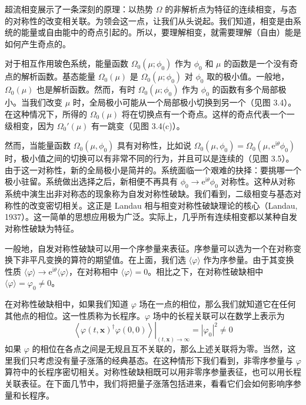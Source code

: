 超流相变展示了一条深刻的原理：以热势 $\Omega$ 的非解析点为特征的连续相变，与态的对称性的改变相关联。为领会这一点，让我们从头说起。我们知道，相变是由系统的能量或自由能中的奇点引起的。所以，要理解相变，就需要理解（自由）能是如何产生奇点的。

对于相互作用玻色系统，能量函数 $\Omega_0(\mu; \phi_0)$ 作为 $\phi_0$ 和 $\mu$ 的函数是一个没有奇点的解析函数。基态能量 $\Omega_0(\mu)$ 是 $\Omega_0(\mu; \phi_0)$ 对 $\phi_0$ 取的极小值。一般地，$\Omega_0(\mu)$ 也是解析函数。然而，有时 $\Omega_0(\mu; \phi_0)$ 作为 $\phi_0$ 的函数有多个局部极小。当我们改变 $\mu$ 时，全局极小可能从一个局部极小切换到另一个（见图 3.4）。在这种情况下，所得的 $\Omega_0(\mu)$ 将在切换点有一个奇点。这样的奇点代表一个一级相变，因为 $\Omega_0'(\mu)$ 有一跳变（见图 3.4(c)）。

然而，当能量函数 $\Omega_0(\mu,\phi_0)$ 具有对称性，比如说 $\Omega_0(\mu,\phi_0) = \Omega_0(\mu,\mathrm{e}^{\mathrm{i}\theta}\phi_0)$ 时，极小值之间的切换可以有非常不同的行为，并且可以是连续的（见图 3.5）。由于这一对称性，新的全局极小是简并的。系统面临一个艰难的抉择：要挑哪一个极小驻留。系统做出选择之后，新相便不再具有 $\phi_0 \to \mathrm{e}^{\mathrm{i}\theta}\phi_0$ 对称性。这种从对称系统中演生出非对称态的现象称为自发对称性破缺。我们看到，二级相变与基态对称性的改变密切相关。这正是 Landau 相与相变对称性破缺理论的核心（Landau, 1937）。这一简单的思想应用极为广泛。实际上，几乎所有连续相变都以某种自发对称性破缺为特征。

一般地，自发对称性破缺可以用一个序参量来表征。序参量可以选为一个在对称变换下非平凡变换的算符的期望值。在上面，我们选 $\langle\varphi\rangle$ 作为序参量。由于其变换性质 $\langle\varphi\rangle \to \mathrm{e}^{\mathrm{i}\theta}\langle\varphi\rangle$，在对称相中 $\langle\varphi\rangle = 0$。相比之下，在对称性破缺相中 $\langle\varphi\rangle = \varphi_0 \neq 0$。

在对称性破缺相中，如果我们知道 $\varphi$ 场在一点的相位，那么我们就知道它在任何其他点的相位。这一性质称为长程序。$\varphi$ 场中的长程关联可以在数学上表示为
\begin{equation*}
\left.\left\langle \varphi(t,\pmb{x})^{\dagger}\varphi(0,0)\right\rangle\right|_{(t,\pmb{x})\to\infty} = |\varphi_0|^2 \neq 0
\end{equation*}
如果 $\varphi$ 的相位在各点之间是无规且互不关联的，那么上述关联将为零。当然，这里我们只考虑没有量子涨落的经典基态。在这种情形下我们看到，非零序参量与 $\varphi$ 算符中的长程序密切相关。对称性破缺相既可以用非零序参量表征，也可以用长程关联表征。在下面几节中，我们将把量子涨落包括进来，看看它们会如何影响序参量和长程序。

